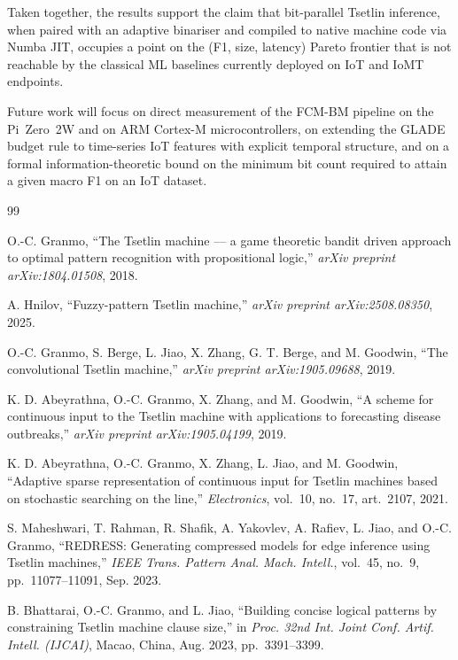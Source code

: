 \documentclass[journal,10pt]{IEEEtran}
\begin{document}
Taken together, the results support the claim that bit-parallel
Tsetlin inference, when paired with an adaptive binariser and compiled
to native machine code via Numba JIT, occupies a point on the (F1, size, latency)
Pareto frontier that is not reachable by the classical ML baselines
currently deployed on IoT and IoMT endpoints.

Future work will focus on direct measurement of the FCM-BM pipeline
on the Pi~Zero~2W and on ARM Cortex-M microcontrollers, on extending
the GLADE budget rule to time-series IoT features with explicit
temporal structure, and on a formal information-theoretic bound on the
minimum bit count required to attain a given macro F1 on an IoT
dataset.

\begin{thebibliography}{99}

O.-C. Granmo,
``The Tsetlin machine --- a game theoretic bandit driven approach to
optimal pattern recognition with propositional logic,''
\emph{arXiv preprint arXiv:1804.01508}, 2018.

A. Hnilov,
``Fuzzy-pattern Tsetlin machine,''
\emph{arXiv preprint arXiv:2508.08350}, 2025.

O.-C. Granmo, S. Berge, L. Jiao, X. Zhang, G. T. Berge, and M. Goodwin,
``The convolutional Tsetlin machine,''
\emph{arXiv preprint arXiv:1905.09688}, 2019.

K. D. Abeyrathna, O.-C. Granmo, X. Zhang, and M. Goodwin,
``A scheme for continuous input to the Tsetlin machine with
applications to forecasting disease outbreaks,''
\emph{arXiv preprint arXiv:1905.04199}, 2019.

K. D. Abeyrathna, O.-C. Granmo, X. Zhang, L. Jiao, and M. Goodwin,
``Adaptive sparse representation of continuous input for Tsetlin
machines based on stochastic searching on the line,''
\emph{Electronics}, vol.~10, no.~17, art.~2107, 2021.

S. Maheshwari, T. Rahman, R. Shafik, A. Yakovlev, A. Rafiev, L. Jiao,
and O.-C. Granmo,
``REDRESS: Generating compressed models for edge inference using
Tsetlin machines,''
\emph{IEEE Trans. Pattern Anal. Mach. Intell.}, vol.~45, no.~9,
pp.~11077--11091, Sep. 2023.

B. Bhattarai, O.-C. Granmo, and L. Jiao,
``Building concise logical patterns by constraining Tsetlin machine
clause size,''
in \emph{Proc. 32nd Int. Joint Conf. Artif. Intell. (IJCAI)},
Macao, China, Aug. 2023, pp.~3391--3399.


\end{thebibliography}
\end{document}
